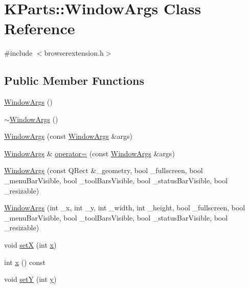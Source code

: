 \hypertarget{classKParts_1_1WindowArgs}{\section{\-K\-Parts\-:\-:\-Window\-Args \-Class \-Reference}
\label{classKParts_1_1WindowArgs}
}


{\ttfamily \#include $<$browserextension.\-h$>$}

\subsection*{\-Public \-Member \-Functions}
\begin{DoxyCompactItemize}
\item 
\hyperlink{classKParts_1_1WindowArgs_a6ba69542d139ad2d0028217e5ddb3e29}{\-Window\-Args} ()
\item 
\hyperlink{classKParts_1_1WindowArgs_a3055e556ecc5e135b6e9c79e2d389030}{$\sim$\-Window\-Args} ()
\item 
\hyperlink{classKParts_1_1WindowArgs_a2d5689aada5007fecb06ab424b9e7e29}{\-Window\-Args} (const \hyperlink{classKParts_1_1WindowArgs}{\-Window\-Args} \&args)
\item 
\hyperlink{classKParts_1_1WindowArgs}{\-Window\-Args} \& \hyperlink{classKParts_1_1WindowArgs_ab066d5b00f6d530333741ff962dc7a98}{operator=} (const \hyperlink{classKParts_1_1WindowArgs}{\-Window\-Args} \&args)
\item 
\hyperlink{classKParts_1_1WindowArgs_a5246d7180dfb422bbae2b0fa42cb7dae}{\-Window\-Args} (const \-Q\-Rect \&\-\_\-geometry, bool \-\_\-fullscreen, bool \-\_\-menu\-Bar\-Visible, bool \-\_\-tool\-Bars\-Visible, bool \-\_\-status\-Bar\-Visible, bool \-\_\-resizable)
\item 
\hyperlink{classKParts_1_1WindowArgs_a9a571192e827587dd0592260da03736e}{\-Window\-Args} (int \-\_\-x, int \-\_\-y, int \-\_\-width, int \-\_\-height, bool \-\_\-fullscreen, bool \-\_\-menu\-Bar\-Visible, bool \-\_\-tool\-Bars\-Visible, bool \-\_\-status\-Bar\-Visible, bool \-\_\-resizable)
\item 
void \hyperlink{classKParts_1_1WindowArgs_a6e2e25bf31a3778e80ad211f10cad269}{set\-X} (int \hyperlink{classKParts_1_1WindowArgs_a671ecb605228581b1b719a9407f4c2be}{x})
\item 
int \hyperlink{classKParts_1_1WindowArgs_a671ecb605228581b1b719a9407f4c2be}{x} () const 
\item 
void \hyperlink{classKParts_1_1WindowArgs_ae3f3e65be412324da1598110ec3273c9}{set\-Y} (int \hyperlink{classKParts_1_1WindowArgs_a3fcb463bb6b6e87fd9cd9fdd55ecd30b}{y})

\end{DoxyCompactItemize}
